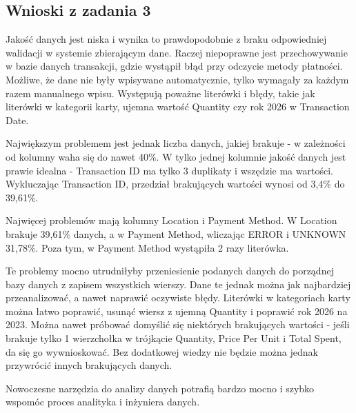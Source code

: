 \documentclass[a4paper,12pt]{article}
\begin{document}
\subsection{Wnioski z zadania 3}

Jakość danych jest niska i wynika to prawdopodobnie z braku odpowiedniej walidacji w systemie zbierającym dane. Raczej niepoprawne jest przechowywanie w bazie danych transakcji, gdzie wystąpił błąd przy odczycie metody płatności. Możliwe, że dane nie były wpisywane automatycznie, tylko wymagały za każdym razem manualnego wpisu. Występują poważne literówki i błędy, takie jak literówki w kategorii karty, ujemna wartość Quantity czy rok 2026 w Transaction Date.

Największym problemem jest jednak liczba danych, jakiej brakuje - w zależności od kolumny waha się do nawet 40\%. W tylko jednej kolumnie jakość danych jest prawie idealna - Transaction ID ma tylko 3 duplikaty i wszędzie ma wartości. Wykluczając Transaction ID, przedział brakujących wartości wynosi od 3,4\% do 39,61\%.

Najwięcej problemów mają kolumny Location i Payment Method. W Location brakuje 39,61\% danych, a w Payment Method, wliczając ERROR i UNKNOWN 31,78\%. Poza tym, w Payment Method wystąpiła 2 razy literówka.

Te problemy mocno utrudniłyby przeniesienie podanych danych do porządnej bazy danych z zapisem wszystkich wierszy. Dane te jednak można jak najbardziej przeanalizować, a nawet naprawić oczywiste błędy. Literówki w kategoriach karty można łatwo poprawić, usunąć wiersz z ujemną Quantity i poprawić rok 2026 na 2023. Można nawet próbować domyślić się niektórych brakujących wartości - jeśli brakuje tylko 1 wierzchołka w trójkącie Quantity, Price Per Unit i Total Spent, da się go wywnioskować. Bez dodatkowej wiedzy nie będzie można jednak przywrócić innych brakujących danych.

Nowoczesne narzędzia do analizy danych potrafią bardzo mocno i szybko wspomóc proces analityka i inżyniera danych.

\printbibliography
\end{document}
